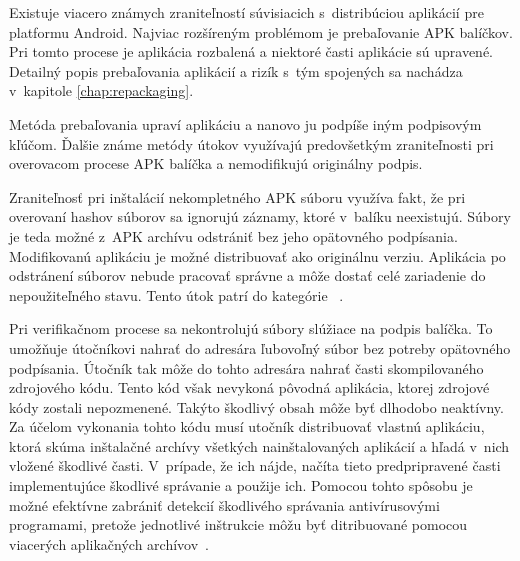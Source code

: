 Existuje viacero známych zraniteľností súvisiacich s~distribúciou aplikácií  pre platformu Android. Najviac rozšíreným problémom je prebaľovanie APK balíčkov. Pri tomto procese je aplikácia rozbalená a niektoré časti aplikácie sú upravené. Detailný popis prebaľovania aplikácií a rizík s~tým spojených sa nachádza v~kapitole \ref{chap:repackaging}.

Metóda prebaľovania upraví aplikáciu a nanovo ju podpíše iným podpisovým kľúčom. Ďalšie známe metódy útokov využívajú predovšetkým zraniteľnosti pri overovacom procese APK balíčka a nemodifikujú originálny podpis. 

Zraniteľnosť pri inštalácií nekompletného APK súboru využíva fakt, že pri overovaní hashov súborov sa ignorujú záznamy, ktoré v~balíku neexistujú. Súbory je teda možné z~APK archívu odstrániť bez jeho opätovného podpísania. Modifikovanú aplikáciu je možné distribuovať ako originálnu verziu. Aplikácia po odstránení súborov nebude pracovať správne a môže dostať celé zariadenie do nepoužiteľného stavu. Tento útok patrí do kategórie ~\cite{A7idcou1z6WqKvQZ}.

Pri verifikačnom procese sa nekontrolujú súbory slúžiace na podpis balíčka. To umožňuje útočníkovi nahrať do adresára  ľubovoľný súbor bez potreby opätovného podpísania. Útočník tak môže do tohto adresára nahrať časti skompilovaného zdrojového kódu. Tento kód však nevykoná pôvodná aplikácia, ktorej zdrojové kódy zostali nepozmenené. Takýto škodlivý obsah môže byť dlhodobo neaktívny. Za účelom vykonania tohto kódu musí utočník distribuovať vlastnú aplikáciu, ktorá skúma inštalačné archívy všetkých nainštalovaných aplikácií a hľadá v~nich vložené škodlivé časti. V~prípade, že ich nájde, načíta tieto predpripravené časti implementujúce škodlivé správanie a použije ich. Pomocou tohto spôsobu je možné efektívne zabrániť detekcií škodlivého správania antivírusovými programami, pretože jednotlivé inštrukcie môžu byť ditribuované pomocou viacerých aplikačných archívov~\cite{A7idcou1z6WqKvQZ}.
